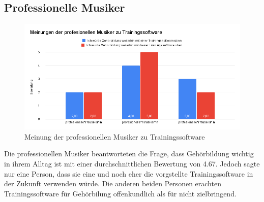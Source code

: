\subsection*{Professionelle Musiker}
\begin{figure}[H]
    \centering
    \includegraphics[width=1\textwidth]{Bilder/eval-profis.png}
    \caption{Meinung der professionellen Musiker zu Trainingssoftware}
\end{figure}
Die professionellen Musiker beantworteten die Frage, dass Gehörbildung wichtig in ihrem Alltag ist mit einer durchschnittlichen Bewertung von 4.67. Jedoch sagte nur eine Person, dass sie eine und noch eher die vorgstellte Trainingssoftware in der Zukunft verwenden würde. Die anderen beiden Personen erachten Trainingssoftware für Gehörbilung offenkundlich als für nicht zielbringend. 

